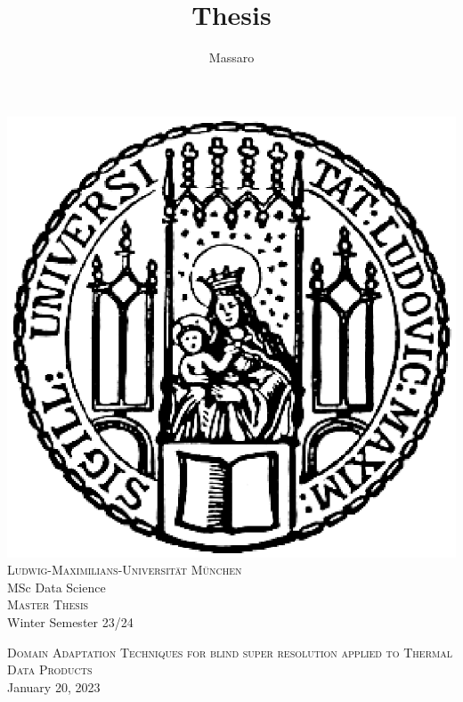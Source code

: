\documentclass[11pt]{article}
\title{Thesis}
\author{Massaro}
\numberwithin{figure}{section}
\numberwithin{table}{section}
\begin{document}
\pagestyle{fancy}
\renewcommand{\sectionmark}[1]{\markboth{}{\thesection\ \ #1}}
\lhead{}
\chead{}
\rhead{\rightmark}
\lfoot{}
\cfoot{}
\rfoot{\thepage}

%
%
\begin{titlepage}

\thispagestyle{empty}

\begin{center}
\includegraphics[scale=0.5]{Includes/0-siegel.eps}\\
\large{\textsc{Ludwig-Maximilians-Universität München}}\\
\large{MSc Data Science }\\
{\textsc{Master Thesis}} \\ 
\vspace{0.5cm}
\small{Winter Semester 23/24 }
\end{center}

\vspace{2cm}


\begin{center}
\Large{\textsc{Domain Adaptation Techniques for blind super resolution applied to Thermal Data Products}} \\
January 20, 2023
\end{center}

\vspace{2cm}


\end{titlepage}
\end{document}
